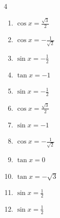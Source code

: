 \begin{multicols}{4}
\begin{enumerate}
  \item $\displaystyle \cos{x}  = \frac{\sqrt{3}}{2}$


  \item $\displaystyle \cos{x}  = -\frac{1}{\sqrt{2}}$


  \item $\displaystyle \sin{x}  = -\frac{1}{2}$


  \item $\displaystyle \tan{x}  = -1$


  \item $\displaystyle \sin{x}  = -\frac{1}{2}$


  \item $\displaystyle \cos{x}  = \frac{\sqrt{3}}{2}$


  \item $\displaystyle \sin{x}  = -1$


  \item $\displaystyle \cos{x}  = -\frac{1}{\sqrt{2}}$


  \item $\displaystyle \tan{x}  = 0$


  \item $\displaystyle \tan{x}  = -\sqrt{3}$


  \item $\displaystyle \sin{x}  = \frac{1}{2}$


  \item $\displaystyle \sin{x}  = \frac{1}{2}$


\end{enumerate}
\end{multicols}
